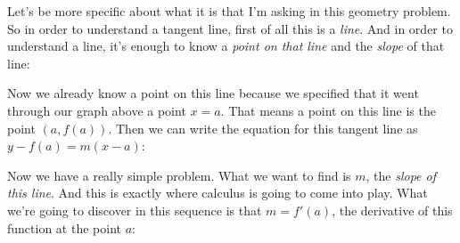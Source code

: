 \documentclass[pdftex, brazil, 12pt, twoside]{article}
\begin{document}
Let's be more specific about what
it is that I'm asking in this geometry problem.
So in order to understand a tangent line, first of all this
is a \emph{line}.
And in order to understand a line,
it's enough to know a \emph{point on that line}
and the \emph{slope} of that line:

\begin{figure}[H]
  \begin{center}
  \end{center}
\end{figure}

Now we already know a point on this line
because we specified that it went through our graph
above a point $x = a$.
That means a point on this line is the point $\left(a, f(a)\right)$.
Then we can write the equation for this tangent line
as $y-f(a)=m(x-a)$:

\begin{figure}[H]
  \begin{center}
  \end{center}
\end{figure}

Now we have a really simple problem.
What we want to find is $m$, the \emph{slope of this line}.
And this is exactly where calculus
is going to come into play.
What we're going to discover in this sequence is
that $m = f'(a)$, the derivative of this function
at the point $a$:
\end{document}
